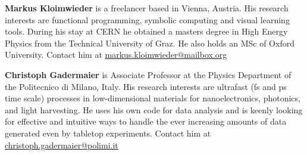 \documentclass[twocolumn]{article}
\begin{document}
\textbf{Markus Kloimwieder} is a freelancer based in Vienna, Austria. His research interests are functional programming, symbolic computing and visual learning tools. During his stay at CERN he obtained a masters degree in High Energy Physics from the Technical University of Graz. He also holds an MSc of Oxford University. Contact him at \url{markus.kloimwieder@mailbox.org}

\textbf{Christoph Gadermaier} is Associate Professor at the Physics Department of the Politecnico di Milano, Italy. His research interests are ultrafast (fs and ps time scale) processes in low-dimensional materials for nanoelectronics, photonics, and light harvesting. He uses his own code for data analysis and is keenly looking for effective and intuitive ways to handle the ever increasing amounts of data generated even by tabletop experiments. Contact him at \url{christoph.gadermaier@polimi.it}
\end{document}

